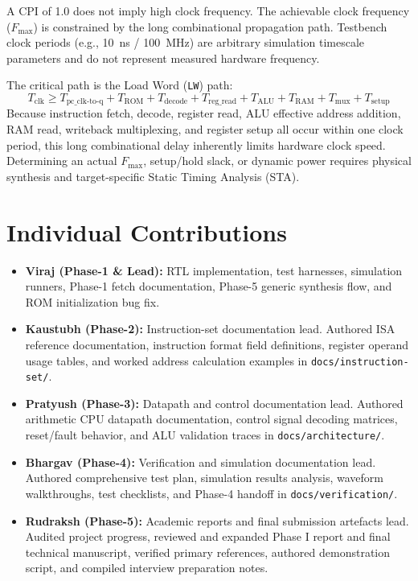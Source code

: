 \documentclass[conference]{IEEEtran}
\begin{document}
A CPI of 1.0 does not imply high clock frequency. The achievable clock frequency ($F_{\max}$) is constrained by the long combinational propagation path. Testbench clock periods (e.g., 10~ns / 100~MHz) are arbitrary simulation timescale parameters and do not represent measured hardware frequency.

The critical path is the Load Word (\texttt{LW}) path:
\begin{equation}
T_{\text{clk}} \ge T_{\text{pc\_clk-to-q}} + T_{\text{ROM}} + T_{\text{decode}} + T_{\text{reg\_read}} + T_{\text{ALU}} + T_{\text{RAM}} + T_{\text{mux}} + T_{\text{setup}}
\end{equation}
Because instruction fetch, decode, register read, ALU effective address addition, RAM read, writeback multiplexing, and register setup all occur within one clock period, this long combinational delay inherently limits hardware clock speed. Determining an actual $F_{\max}$, setup/hold slack, or dynamic power requires physical synthesis and target-specific Static Timing Analysis (STA).

\section{Individual Contributions}
\begin{itemize}
\item \textbf{Viraj (Phase-1 \& Lead):} RTL implementation, test harnesses, simulation runners, Phase-1 fetch documentation, Phase-5 generic synthesis flow, and ROM initialization bug fix.
\item \textbf{Kaustubh (Phase-2):} Instruction-set documentation lead. Authored ISA reference documentation, instruction format field definitions, register operand usage tables, and worked address calculation examples in \texttt{docs/instruction-set/}.
\item \textbf{Pratyush (Phase-3):} Datapath and control documentation lead. Authored arithmetic CPU datapath documentation, control signal decoding matrices, reset/fault behavior, and ALU validation traces in \texttt{docs/architecture/}.
\item \textbf{Bhargav (Phase-4):} Verification and simulation documentation lead. Authored comprehensive test plan, simulation results analysis, waveform walkthroughs, test checklists, and Phase-4 handoff in \texttt{docs/verification/}.
\item \textbf{Rudraksh (Phase-5):} Academic reports and final submission artefacts lead. Audited project progress, reviewed and expanded Phase I report and final technical manuscript, verified primary references, authored demonstration script, and compiled interview preparation notes.
\end{itemize}
\end{document}

